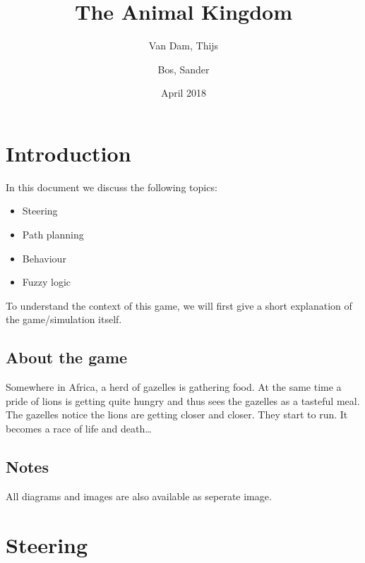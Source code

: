 \documentclass[11pt]{article}
\author{Van Dam, Thijs\\
\and
Bos, Sander\\
}
\title{\huge The Animal Kingdom}
\date{April 2018}
\begin{document}
    \maketitle
    \thispagestyle{empty}
    \newpage
    \newpage
    \setcounter{page}{1}
    \section{Introduction}\label{sec:introduction}
    In this document we discuss the following topics:
    \begin{itemize}
        \item Steering
        \item Path planning
        \item Behaviour
        \item Fuzzy logic
    \end{itemize}
    
    To understand the context of this game, we will first give a short explanation of the game/simulation itself.
    
    \subsection*{About the game}\label{subsec:about}
    Somewhere in Africa, a herd of gazelles is gathering food.
    At the same time a pride of lions is getting quite hungry and thus sees the gazelles as a tasteful meal.
    The gazelles notice the lions are getting closer and closer.
    They start to run.
    It becomes a race of life and death\ldots
    
    \subsection*{Notes}\label{subsec:notes}
    All diagrams and images are also available as seperate image.

    \newpage
    \tableofcontents
    
    \newpage
    \section{Steering}\label{sec:steering}

    \newpage
\end{document}
